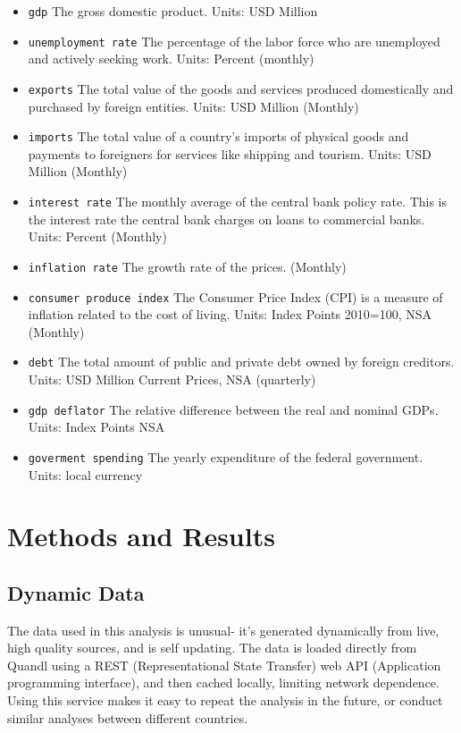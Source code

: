 \documentclass[12pt]{article}
\begin{document}
\begin{itemize}
    \item {\tt gdp} The gross domestic product. Units: USD Million
    \item {\tt unemployment rate} The percentage of the labor force who are unemployed and actively seeking work. Units: Percent (monthly)
    \item {\tt exports} The total value of the goods and services
produced domestically and purchased by foreign entities. Units: USD Million (Monthly)
    \item {\tt imports} The total value of a country's imports of physical goods and payments to foreigners for services like shipping and tourism. Units: USD Million (Monthly)
    \item {\tt interest rate} The monthly average of the central bank policy rate. This is the interest rate the central bank charges on loans to commercial banks. Units: Percent (Monthly)
    \item {\tt inflation rate} The growth rate of the prices. (Monthly)
    \item {\tt consumer produce index} The Consumer Price Index (CPI) is a measure of inflation related to the cost of living. Units: Index Points 2010=100, NSA (Monthly)
    \item {\tt debt} The total amount of public and private debt owned by foreign creditors. Units: USD Million Current Prices, NSA (quarterly)
    \item {\tt gdp deflator} The relative difference between the real and nominal GDPs. Units: Index Points NSA
    \item {\tt goverment spending} The yearly expenditure of the federal
        government. Units: local currency
\end{itemize}

\section{Methods and Results}

\subsection{Dynamic Data}

The data used in this analysis is unusual- it's generated dynamically from
live, high quality sources, and is self updating. The data is loaded directly from Quandl using a REST (Representational 
State Transfer) web API (Application programming interface), and then
cached locally, limiting network dependence.
Using this service makes it easy to repeat the analysis in the future, or conduct similar analyses between
different countries.
\end{document}
